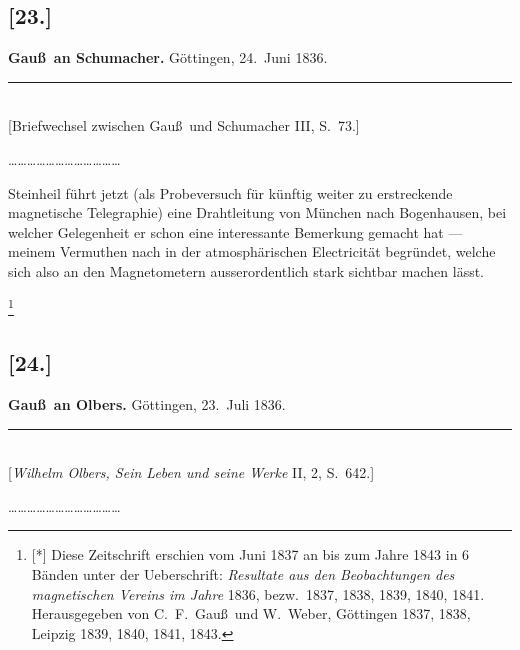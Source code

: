 \documentclass[12pt,a4paper]{article}
\theoremstyle{plain}
\theoremstyle{definition}
\theoremstyle{remark}
\begin{document}
\subsection*{[23.]}
\begin{center}
\textbf{Gau\ss\ an Schumacher.} G\"ottingen, 24.~Juni 1836.
\end{center}
\begin{center}
\rule{6cm}{0.4pt}\\[4pt]
[Briefwechsel zwischen Gau\ss\ und Schumacher III, S.~73.]
\end{center}

\smallskip
\ldots\ldots\ldots\ldots\ldots\ldots\ldots\ldots\ldots\ldots\ldots\ldots
\smallskip

{\sc Steinheil} f\"uhrt jetzt (als Probeversuch f\"ur k\"unftig
weiter zu erstreckende magnetische Telegraphie) eine Drahtleitung
von M\"unchen nach Bogenhausen, bei welcher Gelegenheit er schon
eine interessante Bemerkung gemacht hat --- meinem Vermuthen nach in
der atmosph\"arischen Electricit\"at begr\"undet, welche sich also an
den Magnetometern ausserordentlich stark sichtbar machen l\"asst.

\footnote{[*] Diese Zeitschrift erschien vom Juni 1837 an bis zum Jahre 1843 in 6
B\"anden unter der Ueberschrift: {\it Resultate aus den Beobachtungen des
magnetischen Vereins im Jahre} 1836, bezw.~1837, 1838, 1839, 1840, 1841.
Herausgegeben von C.~F.~Gau\ss\ und W.~Weber, G\"ottingen 1837, 1838,
Leipzig 1839, 1840, 1841, 1843.}

\subsection*{[24.]}
\begin{center}
\textbf{Gau\ss\ an Olbers.} G\"ottingen, 23.~Juli 1836.
\end{center}
\begin{center}
\rule{6cm}{0.4pt}\\[4pt]
[{\it Wilhelm Olbers, Sein Leben und seine Werke} II, 2, S.~642.]
\end{center}

\smallskip
\ldots\ldots\ldots\ldots\ldots\ldots\ldots\ldots\ldots\ldots\ldots\ldots
\smallskip
\end{document}
